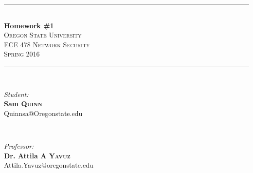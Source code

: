 \documentclass[letterpaper,11pt,notitlepage,fleqn]{article}
\begin{document}
\begin{titlepage}
\vspace*{\fill}

\newcommand{\HRule}{\rule{\linewidth}{0.5mm}} %

\center %


\HRule \\[0.4cm]
{ \huge \bfseries Homework \#1}\\[0.4cm] %


\textsc{\LARGE Oregon State University}\\[0.5cm] %
\textsc{\Large ECE 478 Network Security}\\[0.5cm] %
\textsc{\large Spring 2016}\\[0.5cm] %


\HRule \\[1.5cm]

\begin{minipage}{0.4\textwidth}
\begin{flushleft} \large
\emph{Student:}\\
        \noindent \textbf{Sam \textsc{Quinn}} \\ %
        {\small Quinnsa@Oregonstate.edu}
        \end{flushleft}
        \end{minipage}
        ~
        \begin{minipage}{0.4\textwidth}
        \begin{flushright} \large
        \emph{Professor:} \\
            \noindent \textbf{Dr. Attila A \textsc{Yavuz}} \\ %
            {\small Attila.Yavuz@oregonstate.edu}
            \end{flushright}
            \end{minipage}\\[3cm]


\end{titlepage}
\end{document}
